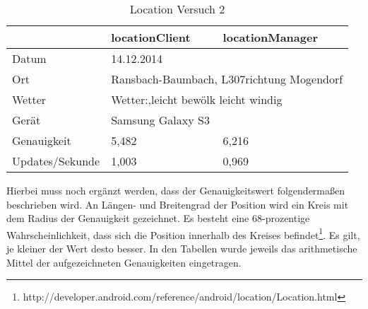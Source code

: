 \begin{table}[h]
\caption{Location Versuch 2}
\begin{tabular}{l|l|l|}
\cline{2-3}
                                      & locationClient                & locationManager                \\ \hline
\multicolumn{1}{|l|}{Datum}           & \multicolumn{2}{l|}{14.12.2014}                                \\ \hline
\multicolumn{1}{|l|}{Ort}             & \multicolumn{2}{l|}{Ransbach-Baumbach, L307richtung Mogendorf} \\ \hline
\multicolumn{1}{|l|}{Wetter}          & \multicolumn{2}{l|}{Wetter:,leicht bewölk leicht windig}       \\ \hline
\multicolumn{1}{|l|}{Gerät}           & \multicolumn{2}{l|}{Samsung Galaxy S3}                         \\ \hline
\multicolumn{1}{|l|}{Genauigkeit}     & 5,482                         & 6,216                          \\ \hline
\multicolumn{1}{|l|}{Updates/Sekunde} & 1,003                         & 0,969                          \\ \hline
\end{tabular}
\label{tab:lV2}
\end{table}

Hierbei muss noch ergänzt werden, dass der Genauigkeitswert folgendermaßen beschrieben wird. An Längen- und Breitengrad
der Position wird ein Kreis mit dem Radius der Genauigkeit gezeichnet. Es besteht eine 68-prozentige Wahrscheinlichkeit, dass
sich die Position innerhalb des Kreises befindet\footnote{http://developer.android.com/reference/android/location/Location.html}.
Es gilt, je kleiner der Wert desto besser. In den Tabellen wurde jeweils das arithmetische Mittel der aufgezeichneten Genauigkeiten eingetragen.


